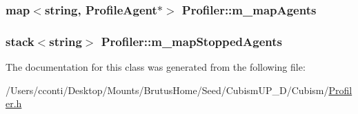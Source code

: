 \subsubsection[{m\+\_\+map\+Agents}]{\setlength{\rightskip}{0pt plus 5cm}map$<$string, {\bf Profile\+Agent}$\ast$$>$ Profiler\+::m\+\_\+map\+Agents\hspace{0.3cm}{\ttfamily [protected]}}\label{class_profiler_a289df33e2c71075ff9bf2d2c3e180c02}
\hypertarget{class_profiler_a898eec43a1f9c8ed482d169e90f4a7bd}{}
\subsubsection[{m\+\_\+map\+Stopped\+Agents}]{\setlength{\rightskip}{0pt plus 5cm}stack$<$string$>$ Profiler\+::m\+\_\+map\+Stopped\+Agents\hspace{0.3cm}{\ttfamily [protected]}}\label{class_profiler_a898eec43a1f9c8ed482d169e90f4a7bd}


The documentation for this class was generated from the following file\+:\begin{DoxyCompactItemize}
\item 
/\+Users/cconti/\+Desktop/\+Mounts/\+Brutus\+Home/\+Seed/\+Cubism\+U\+P\+\_\+D/\+Cubism/\hyperlink{_profiler_8h}{Profiler.\+h}\end{DoxyCompactItemize}
